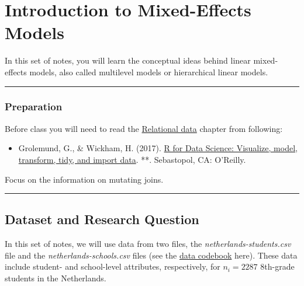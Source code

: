\documentclass[]{book}
\providecommand{\tightlist}{%
  \setlength{\itemsep}{0pt}\setlength{\parskip}{0pt}}
\begin{document}
\hypertarget{intro-lmer}{%
\chapter{Introduction to Mixed-Effects Models}\label{intro-lmer}}

In this set of notes, you will learn the conceptual ideas behind linear mixed-effects models, also called multilevel models or hierarchical linear models.

\begin{center}\rule{0.5\linewidth}{\linethickness}\end{center}

\hypertarget{preparation-7}{%
\subsection*{Preparation}\label{preparation-7}}

Before class you will need to read the \href{https://r4ds.had.co.nz/relational-data.html}{Relational data} chapter from following:

\begin{itemize}
\tightlist
\item
  Grolemund, G., \& Wickham, H. (2017). \href{https://r4ds.had.co.nz/}{R for Data Science: Visualize, model, transform, tidy, and import data}. **. Sebastopol, CA: O'Reilly.
\end{itemize}

Focus on the information on mutating joins.

\begin{center}\rule{0.5\linewidth}{\linethickness}\end{center}

\hypertarget{dataset-and-research-question-6}{%
\section{Dataset and Research Question}\label{dataset-and-research-question-6}}

In this set of notes, we will use data from two files, the \emph{netherlands-students.csv} file and the \emph{netherlands-schools.csv} files (see the \protect\hyperlink{netherlands}{data codebook} here). These data include student- and school-level attributes, respectively, for \(n_i=2287\) 8th-grade students in the Netherlands.
\end{document}
